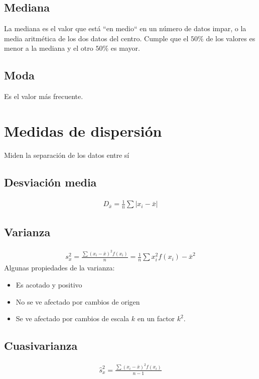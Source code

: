 \documentclass{article}
\begin{document}
\subsection{Mediana}
La mediana es el valor que está ``en medio`` en un número de datos impar, o la media aritmética de los dos datos del centro.
Cumple que el $50\%$ de los valores es menor a la mediana y el otro $50\%$ es mayor.
\subsection{Moda}
Es el valor más frecuente.
\section{Medidas de dispersión}
Miden la separación de los datos entre sí
\subsection{Desviación media}
\begin{equation}
    \begin{split}
        D_{\bar{x}}=\frac{1}{n}\sum|x_{i}-\bar{x}|
    \end{split}
\end{equation}
\subsection{Varianza}
\begin{equation}
    \begin{split}
        s^{2}_{x}=\frac{\sum(x_{i}-\bar{x})^{2}f(x_{i})}{n}=\frac{1}{n}\sum x_{i}^{2}f(x_{i})-\bar{x}^{2}
    \end{split}
\end{equation}
Algunas propiedades de la varianza:
\begin{itemize}
    \item Es acotado y positivo
    \item No se ve afectado por cambios de origen
    \item Se ve afectado por cambios de escala $k$ en un factor $k^{2}$. 
\end{itemize}
\subsection{Cuasivarianza}
\begin{equation}
    \begin{split}
        \hat{s}^{2}_{x}=\frac{\sum(x_{i}-\bar{x})^{2}f(x_{i})}{n-1}
    \end{split}
\end{equation}
\end{document}

